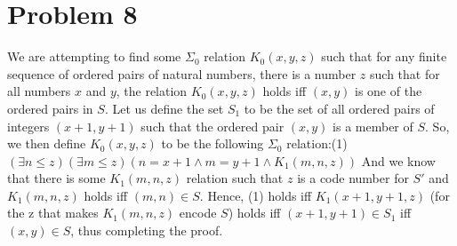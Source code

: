 \documentclass{article}
\theoremstyle{definition}
\begin{document}
\section*{Problem 8}
We are attempting to find some $\Sigma_0$ relation $K_0(x,y,z)$ such that for any finite sequence of ordered pairs of natural numbers, there is a number $z$ 
such that for all numbers $x$ and $y$, the relation $K_0(x,y,z)$ holds iff $(x,y)$ is one of the ordered pairs in $S$. Let us define the set $S_1$ to be the 
set of all ordered pairs of integers $(x+1,y+1)$ such that the ordered pair $(x,y)$ is a member of $S$. So, we then define $K_0(x,y,z)$ to be the following
$\Sigma_0$ relation:\newline (1) $(\exists n\le z)(\exists m\le z)(n=x+1\wedge m=y+1\wedge K_1(m,n,z))$\newline
And we know that there is some $K_1(m,n,z)$ relation such that $z$ is a code number for $S'$ and $K_1(m,n,z)$ holds iff $(m,n)\in S$.
 Hence, (1) holds iff \newline $K_1(x+1,y+1,z)$ (for the z that makes $K_1(m,n,z)$ encode $S$) holds iff 
$(x+1,y+1)\in S_1$ iff $(x,y)\in S$, thus completing the proof. 
\end{document}
